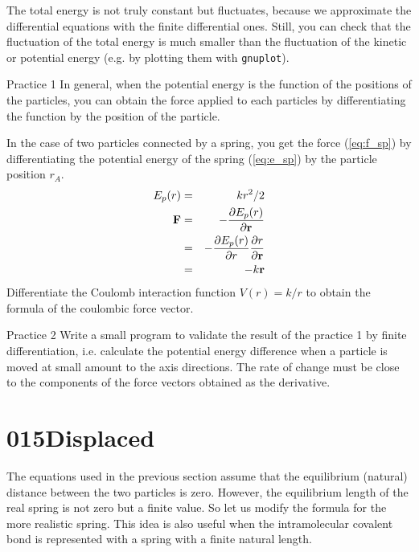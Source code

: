 \documentclass[a4,10pt]{article}
\begin{document}
The total energy is not truly constant but fluctuates, because we
approximate the differential equations with the finite differential
ones.
Still, you can check that the fluctuation of the total energy is much
smaller than the fluctuation of the kinetic or potential energy
(e.g. by plotting them with {\tt gnuplot}).

\begin{itembox}[l]{Practice 1}
In general, when the potential energy is the function of
the positions of the particles, you can obtain the force applied to
each  particles by differentiating the function by the position of the
particle.

In the case of two particles connected by a spring, you get the force
(\ref{eq:f_sp}) by differentiating the potential energy of the spring
(\ref{eq:e_sp}) by the particle position $r_A$.
\begin{eqnarray}
E_p(r)&=&kr^2/2\\
{\bf F}&=&-\frac{\partial E_p(r)}{\partial {\bf r}}\\
&=&-\frac{\partial E_p(r)}{\partial r}\frac{\partial r}{\partial {\bf r}}\\
&=&-k{\bf r}
\end{eqnarray}
Differentiate the Coulomb interaction function $V(r) = k / r$ to
obtain the formula of the coulombic force vector.
\end{itembox}

\begin{itembox}[l]{Practice 2}
Write a small program to validate the result of the practice 1 by finite differentiation,
i.e. calculate the potential energy difference when a particle is
moved at small amount to the axis directions.  The rate of change must
be close to the components of the force vectors obtained as the derivative.
\end{itembox}

\section{015Displaced}

The equations used in the previous section assume that the equilibrium
(natural) distance between the two particles is zero.  However, the
equilibrium length of the real spring is not zero but a finite value.
So let us modify the formula for the more realistic spring.  This idea
is also useful when the intramolecular covalent bond is represented
with a spring with a finite natural length.
\end{document}
